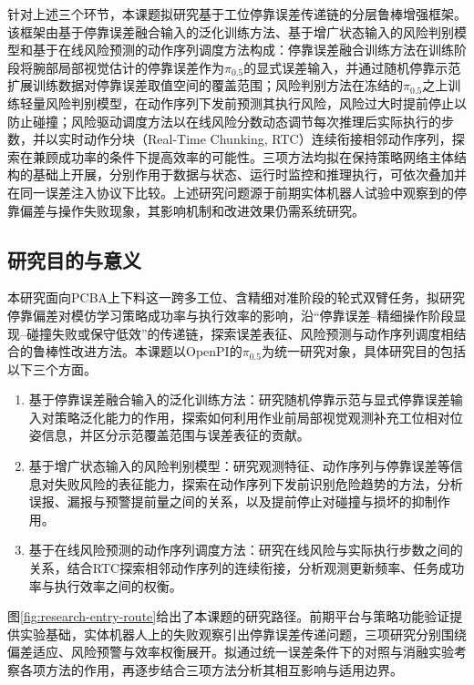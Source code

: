 针对上述三个环节，本课题拟研究基于工位停靠误差传递链的分层鲁棒增强框架。该框架由基于停靠误差融合输入的泛化训练方法、基于增广状态输入的风险判别模型和基于在线风险预测的动作序列调度方法构成：停靠误差融合训练方法在训练阶段将腕部局部视觉估计的停靠误差作为\(\pi_{0.5}\)的显式误差输入，并通过随机停靠示范扩展训练数据对停靠误差取值空间的覆盖范围；风险判别方法在冻结的\(\pi_{0.5}\)之上训练轻量风险判别模型，在动作序列下发前预测其执行风险，风险过大时提前停止以防止碰撞；风险驱动调度方法以在线风险分数动态调节每次推理后实际执行的步数，并以实时动作分块（Real-Time Chunking, RTC）连续衔接相邻动作序列，探索在兼顾成功率的条件下提高效率的可能性。三项方法均拟在保持策略网络主体结构的基础上开展，分别作用于数据与状态、运行时监控和推理执行，可依次叠加并在同一误差注入协议下比较。上述研究问题源于前期实体机器人试验中观察到的停靠偏差与操作失败现象，其影响机制和改进效果仍需系统研究。

\subsection{研究目的与意义}
本研究面向PCBA上下料这一跨多工位、含精细对准阶段的轮式双臂任务，拟研究停靠偏差对模仿学习策略成功率与执行效率的影响，沿“停靠误差--精细操作阶段显现--碰撞失败或保守低效”的传递链，探索误差表征、风险预测与动作序列调度相结合的鲁棒性改进方法。本课题以OpenPI的\(\pi_{0.5}\)为统一研究对象，具体研究目的包括以下三个方面。

\begin{enumerate}
  \item 基于停靠误差融合输入的泛化训练方法：研究随机停靠示范与显式停靠误差输入对策略泛化能力的作用，探索如何利用作业前局部视觉观测补充工位相对位姿信息，并区分示范覆盖范围与误差表征的贡献。
  \item 基于增广状态输入的风险判别模型：研究观测特征、动作序列与停靠误差等信息对失败风险的表征能力，探索在动作序列下发前识别危险趋势的方法，分析误报、漏报与预警提前量之间的关系，以及提前停止对碰撞与损坏的抑制作用。
  \item 基于在线风险预测的动作序列调度方法：研究在线风险与实际执行步数之间的关系，结合RTC探索相邻动作序列的连续衔接，分析观测更新频率、任务成功率与执行效率之间的权衡。
\end{enumerate}

图\ref{fig:research-entry-route}给出了本课题的研究路径。前期平台与策略功能验证提供实验基础，实体机器人上的失败观察引出停靠误差传递问题，三项研究分别围绕偏差适应、风险预警与效率权衡展开。拟通过统一误差条件下的对照与消融实验考察各项方法的作用，再逐步结合三项方法分析其相互影响与适用边界。

